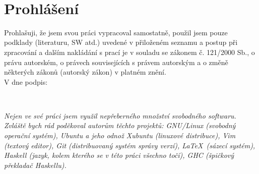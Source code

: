 \setcounter{page}{1}
\thispagestyle{empty}

\newpage


~\\[15cm]
\section*{Prohlášení}

Prohlašuji, že jsem svou práci vypracoval samostatně, použil jsem pouze
podklady (literaturu, SW atd.) uvedené v přiloženém seznamu a postup při
zpracování a dalším nakládání s prací je v souladu se zákonem č. 121/2000 Sb.,
o právu autorském, o právech souvisejících s právem autorským a o změně
některých zákonů (autorský zákon) v platném znění.\\[0.7cm]

V \makebox[3cm]{\dotfill} dne \makebox[4cm]{\dotfill}
podpis: \makebox[6cm]{\dotfill}

\newpage


~\\[15cm]
\begin{adjustwidth}{3cm}{0cm}

\textit{Nejen ve své práci jsem využil nepřeberného množství svobodného
  softwaru.  Zvláště bych rád poděkoval autorům těchto projektů: GNU/Linux
  (svobodný operační systém), Ubuntu a jeho odnož Xubuntu (linuxové distribuce),
  Vim (textový editor), Git (distribuovaný systém správy verzí), \LaTeX\ (sázecí
  systém), Haskell (jazyk, kolem kterého se v této práci všechno točí), GHC
(špičkový překladač Haskellu).  }

\end{adjustwidth}

\newpage

